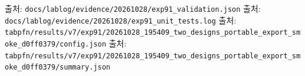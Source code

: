 출처: \texttt{docs/\allowbreak{}\allowbreak{}lab\allowbreak{}log/\allowbreak{}\allowbreak{}evid\allowbreak{}ence/\allowbreak{}\allowbreak{}202\allowbreak{}61028/\allowbreak{}\allowbreak{}ex\allowbreak{}p91\_\allowbreak{}\allowbreak{}vali\allowbreak{}dation.\allowbreak{}j\allowbreak{}son} 출처: \texttt{docs/\allowbreak{}\allowbreak{}lab\allowbreak{}log/\allowbreak{}\allowbreak{}evid\allowbreak{}ence/\allowbreak{}\allowbreak{}202\allowbreak{}61028/\allowbreak{}\allowbreak{}ex\allowbreak{}p91\_\allowbreak{}\allowbreak{}unit\allowbreak{}\_\allowbreak{}\allowbreak{}tests.\allowbreak{}l\allowbreak{}og} 출처: \texttt{tabpfn/\allowbreak{}\allowbreak{}r\allowbreak{}esults/\allowbreak{}\allowbreak{}v\allowbreak{}7/\allowbreak{}\allowbreak{}exp91/\allowbreak{}\allowbreak{}20261028\allowbreak{}\_\allowbreak{}\allowbreak{}195409\_\allowbreak{}\allowbreak{}two\_\allowbreak{}\allowbreak{}desi\allowbreak{}gns\_\allowbreak{}\allowbreak{}port\allowbreak{}able\_\allowbreak{}\allowbreak{}exp\allowbreak{}ort\_\allowbreak{}\allowbreak{}smok\allowbreak{}e\_\allowbreak{}\allowbreak{}d0ff03\allowbreak{}79/\allowbreak{}\allowbreak{}confi\allowbreak{}g.\allowbreak{}json} 출처: \texttt{tabpfn/\allowbreak{}\allowbreak{}r\allowbreak{}esults/\allowbreak{}\allowbreak{}v\allowbreak{}7/\allowbreak{}\allowbreak{}exp91/\allowbreak{}\allowbreak{}20261028\allowbreak{}\_\allowbreak{}\allowbreak{}195409\_\allowbreak{}\allowbreak{}two\_\allowbreak{}\allowbreak{}desi\allowbreak{}gns\_\allowbreak{}\allowbreak{}port\allowbreak{}able\_\allowbreak{}\allowbreak{}exp\allowbreak{}ort\_\allowbreak{}\allowbreak{}smok\allowbreak{}e\_\allowbreak{}\allowbreak{}d0ff03\allowbreak{}79/\allowbreak{}\allowbreak{}summa\allowbreak{}ry.\allowbreak{}json}



